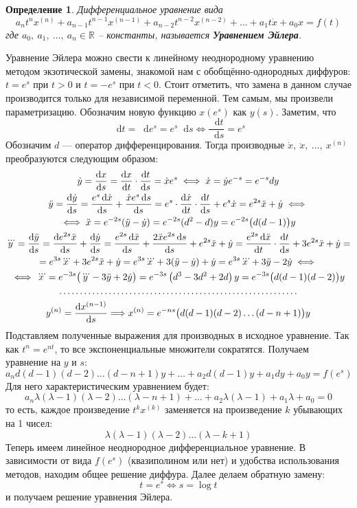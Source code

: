 \documentclass[a4paper,12pt]{article}
\newcommand{\dotffill}[1]{\parbox[t]{#1}{\dotfill}}
\newtheorem{definition}{Определение}
\newcommand{\R}{\mathbb{R}}
\renewcommand*\d{\mathop{}\!\mathrm{d}}
\newcommand{\dy}{\dot{y}}
\newcommand{\ddy}{\ddot{y}}
\newcommand{\dddy}{\dddot{y}}
\newcommand{\dx}{\dot{x}}
\newcommand{\ddx}{\ddot{x}}
\newcommand{\dddx}{\dddot{x}}
\newcommand{\bto}{\Longrightarrow}
\begin{document}
\begin{definition}
	Дифференциальное уравнение вида
	\[a_nt^nx^{(n)} + a_{n - 1}t^{n - 1}x^{(n - 1)} + a_{n - 2}t^{n - 2}x^{(n - 2)} + \ldots + a_1t\dx + a_0 x = f(t)\]
	где $a_0,\ a_1,\ \ldots,\ a_n \in \R$ -- константы, называется \textbf{Уравнением Эйлера}.
\end{definition}
Уравнение Эйлера можно свести к линейному неоднородному уравнению методом экзотической замены, знакомой нам с обобщённо-однородных диффуров: $t = e^{s}$ при $t > 0$  и $t = - e^s$ при $t < 0$. Стоит отметить, что замена в данном случае производится только для независимой переменной. Тем самым, мы произвели параметризацию. Обозначим новую функцию $x\left(e^s\right)$ как $y(s)$. Заметим, что \[\d t = \d e^s = e^s \d s \iff \dfrac{\d t}{\d s} = e^s\] 
Обозначим $d$ --- оператор дифференцирования.
Тогда производные $\dx,\ \ddx,\ \ldots,\ x^{(n)}$ преобразуются следующим образом:
\begin{gather*}
\dy = \dfrac{\d x}{\d s} = \dfrac{\d x}{\d t} \cdot \dfrac{\d t}{\d s}= \dx e^s \iff \dx = \dy e^{-s} = e^{-s}dy\\
\ddy = \dfrac{\d \dy}{\d s} = \dfrac{e^s\d \dx}{\d s} + \dfrac{\dx e^s\d s}{\d s} = e^s\cdot \dfrac{\d \dx}{\d t}\cdot \dfrac{\d t}{\d s} + e^s\dx = e^{2s}\ddx + \dy \iff\\
\iff  \ddx = e^{-2s}(\ddy - \dy) = e^{-2s}(d^2 - d)y = e^{-2s}\big(d(d - 1)\big)y\\
\dddy = \dfrac{\d \ddy}{\d s} = \dfrac{\d e^{2s}\ddx}{\d s} + \dfrac{\d \dy}{\d s} = \dfrac{e^{2s}\d \ddx}{\d s} + \dfrac{2\ddx e^{2s}\d s}{\d s} + e^{2s}\ddx + \dy = \dfrac{e^{2s}\d \ddx}{\d t}\cdot \dfrac{\d t}{\d s} + 3e^{2s}\ddx + \dy = \\
= e^{3s}\dddx + 3e^{2s}\ddx + \dy = e^{3s}\dddx + 3(\ddy - \dy) + \dy = e^{3s}\dddx + 3\ddy - 2\dy \iff\\
\iff  \dddx = e^{-3s}\big(\dddy - 3\ddy + 2\dy\big) = e^{-3s}\left(d^3 - 3d^2 + 2d\right)y = e^{-3s}\big(d(d - 1)(d - 2)\big)y\\
\dotffill{0.75\textwidth}\\
y^{(n)} = \dfrac{\d x^{(n - 1)}}{\d s} \bto x^{(n)} = e^{-ns}\big(d(d - 1)(d - 2)\ldots(d - n + 1)\big)y
\end{gather*}
Подставляем полученные выражения для производных в исходное уравнение.
Так как $t^n = e^{nt}$, то все экспоненциальные множители сократятся.
Получаем уравнение на $y$ и $s$:
\[a_nd(d - 1)(d - 2)\ldots(d - n + 1)y + \ldots + a_2d(d - 1)y + a_1dy + a_0y = f(e^s)\] Для него характеристическим уравнением будет:
\[a_n\lambda(\lambda - 1)(\lambda - 2)\ldots(\lambda - n + 1) + \ldots + a_2\lambda(\lambda - 1) + a_1\lambda + a_0 = 0\]
то есть, каждое произведение $t^kx^{(k)}$ заменяется на произведение $k$ убывающих на 1 чисел:
\[\lambda(\lambda - 1)(\lambda - 2)\ldots(\lambda - k + 1)\]
Теперь имеем линейное неоднородное дифференциальное уравнение.
В зависимости от вида $f(e^s)$ (квазиполином или нет) и удобства использования методов, находим общее решение диффура.
Далее делаем обратную замену:
\[t = e^s \iff s = \log t\]
и получаем решение уравнения Эйлера.
\ \\
\end{document}
